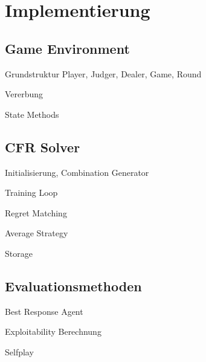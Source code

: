 \chapter{Implementierung}

\section{Game Environment}
Grundstruktur Player, Judger, Dealer, Game, Round

Vererbung

State Methods

\section{CFR Solver}
Initialisierung, Combination Generator

Training Loop

Regret Matching

Average Strategy

Storage

\section{Evaluationsmethoden}
Best Response Agent

Exploitability Berechnung

Selfplay
